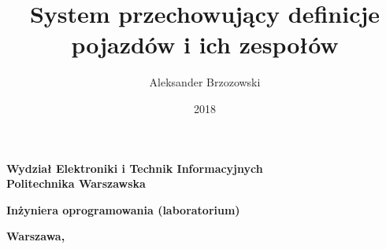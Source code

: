 \documentclass[a4paper,titlepage,11pt,twoside,floatssmall]{report}
\begin{document}
\frenchspacing

\title{\bf System przechowujący definicje pojazdów i ich zespołów\vskip 0.1cm}
\author{Aleksander Brzozowski}
\date{2018}

\makeatletter
\renewcommand{\maketitle}{\begin{titlepage}
\begin{center}{\LARGE {\bf
Wydział Elektroniki i Technik Informacyjnych}}\\
\vspace{0.4cm}
{\LARGE {\bf Politechnika Warszawska}}\\
\vspace{0.3cm}
\end{center}
\vspace{5cm}
\begin{center}
{\bf \LARGE Inżyniera oprogramowania (laboratorium) \vskip 0.1cm}
\end{center}
\vspace{1cm}
\begin{center}
{\bf \LARGE \@title}
\end{center}
\vspace{2cm}
\begin{center}
{\bf \Large \@author \par}
\end{center}
\vspace*{\stretch{6}}
\begin{center}
\bf{\large{Warszawa, \@date\vskip 0.1cm}}
\end{center}
\end{titlepage}
}
\makeatother

\maketitle

\tableofcontents




\end{document}
